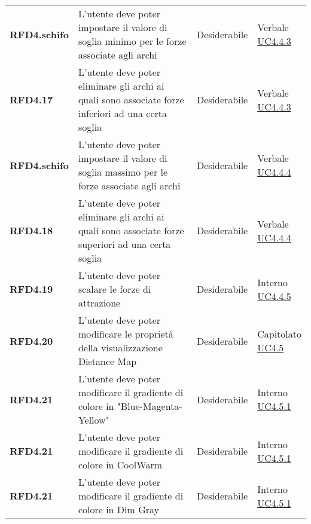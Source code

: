 \begin{longtable}[H]{>{\raggedright\bfseries}m{20mm} >{\raggedright}m{90mm} >{\raggedright}m{28mm} >{\raggedright\arraybackslash}m{30mm}}
    RFD4.schifo
    & L'utente deve poter impostare il valore di soglia minimo per le forze associate agli archi
    & Desiderabile
    & \makecell{ Verbale \\ \hyperref[par:uc4.4.2]{UC4.4.3} }\\

    RFD4.17
    & L'utente deve poter eliminare gli archi ai quali sono associate forze inferiori ad una certa soglia
    & Desiderabile
    & \makecell{ Verbale \\ \hyperref[par:uc4.4.3]{UC4.4.3} }\\

    RFD4.schifo
    & L'utente deve poter impostare il valore di soglia massimo per le forze associate agli archi
    & Desiderabile
    & \makecell{ Verbale \\ \hyperref[par:uc4.4.2]{UC4.4.4} }\\

    RFD4.18
    & L'utente deve poter eliminare gli archi ai quali sono associate forze superiori ad una certa soglia
    & Desiderabile
    & \makecell{ Verbale \\ \hyperref[par:uc4.4.4]{UC4.4.4} }\\

    RFD4.19
    & L'utente deve poter scalare le forze di attrazione
    & Desiderabile
    & \makecell{ Interno \\ \hyperref[par:uc4.4.5]{UC4.4.5} }\\

    RFD4.20
    & L'utente deve poter modificare le proprietà della visualizzazione Distance Map
    & Desiderabile
    & \makecell{ Capitolato \\ \hyperref[ssub:uc4.5]{UC4.5} }\\

    RFD4.21
    & L'utente deve poter modificare il gradiente di colore in "Blue-Magenta-Yellow"
    & Desiderabile
    & \makecell{ Interno \\ \hyperref[par:uc4.5.1]{UC4.5.1} }\\

    RFD4.21
    & L'utente deve poter modificare il gradiente di colore in CoolWarm
    & Desiderabile
    & \makecell{ Interno \\ \hyperref[par:uc4.5.1]{UC4.5.1} }\\

    RFD4.21
    & L'utente deve poter modificare il gradiente di colore in Dim Gray
    & Desiderabile
    & \makecell{ Interno \\ \hyperref[par:uc4.5.1]{UC4.5.1} }\\


\end{longtable}
